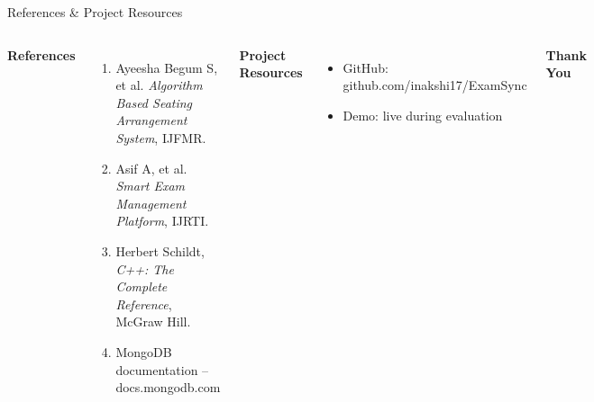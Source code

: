 \documentclass[aspectratio=169,11pt]{beamer}
\begin{document}
\begin{frame}{References \& Project Resources}

\begin{columns}[T,totalwidth=\textwidth]


\textbf{\color{GEUBlue}References}

\begin{enumerate}\itemsep3pt
    \scriptsize
    \item Ayeesha Begum S, et al. \textit{Algorithm Based Seating Arrangement System}, IJFMR.
    \item Asif A, et al. \textit{Smart Exam Management Platform}, IJRTI.
    \item Herbert Schildt, \textit{C++: The Complete Reference}, McGraw Hill.
    \item MongoDB documentation -- docs.mongodb.com
\end{enumerate}


\textbf{\color{GEUBlue}Project Resources}

\begin{itemize}\itemsep3pt
    \small
    \item GitHub: {\scriptsize github.com/inakshi17/ExamSync}
    \item Demo: live during evaluation
\end{itemize}

\vfill

\begin{center}

\colorbox{GEUBlue}{
\parbox{.82\textwidth}{
\centering
\color{white}
\Large\textbf{Thank You}
}}

\end{center}

\end{columns}

\end{frame}
\end{document}
